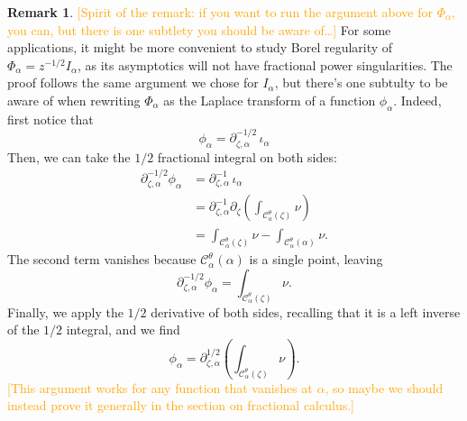\documentclass{article}
\newcommand{\fracderiv}[3]{\partial^{#1}_{#2, #3}}
\theoremstyle{definition}
\newtheorem{remark}[definition]{Remark}
\theoremstyle{plain}
\begin{document}
\begin{remark}\label{rmk:1/2-deriv}
    \textcolor{orange}{[Spirit of the remark: if you want to run the argument above for $\Phi_\alpha$, you can, but there is one subtlety you should be aware of\ldots]} For some applications, it might be more convenient to study Borel regularity of $\Phi_\alpha=z^{-1/2}I_\alpha$, as its asymptotics will not have fractional power singularities. The proof follows the same argument we chose for $I_\alpha$, but there's one subtulty to be aware of when rewriting $\Phi_\alpha$ as the Laplace transform of a function $\phi_\alpha$. Indeed, first notice that \[\phi_\alpha = \fracderiv{-1/2}{\zeta}{\alpha} \, \iota_\alpha \]
    Then, we can take the $1/2$ fractional integral on both sides:
    \begin{align*}
        \fracderiv{-1/2}{\zeta}{\alpha} \phi_\alpha &= \fracderiv{-1}{\zeta}{\alpha} \, \iota_\alpha \\
        & = \fracderiv{-1}{\zeta}{\alpha} \partial_\zeta \left( \int_{\mathcal{C}_a^\theta(\zeta)}\nu \right) \\
        & = \int_{\mathcal{C}_\alpha^\theta(\zeta)}\nu - \int_{\mathcal{C}_\alpha^\theta(\alpha)}\nu.
    \end{align*}
    The second term vanishes because $\mathcal{C}_\alpha^\theta(\alpha)$ is a single point, leaving
    \[ \fracderiv{-1/2}{\zeta}{\alpha} \phi_\alpha = \int_{\mathcal{C}_\alpha^\theta(\zeta)}\nu. \]
    Finally, we apply the $1/2$ derivative of both sides, recalling that it is a left inverse of the $1/2$ integral, and we find
    \begin{equation}\label{eqn:formula--1/2}\phi_\alpha= \fracderiv{1/2}{\zeta}{\alpha} \left( \int_{\mathcal{C}_\alpha^\theta(\zeta)}\nu \right).\end{equation}
    \textcolor{orange}{[This argument works for any function that vanishes at $\alpha$, so maybe we should instead prove it generally in the section on fractional calculus.]}
\end{remark}
\end{document}
